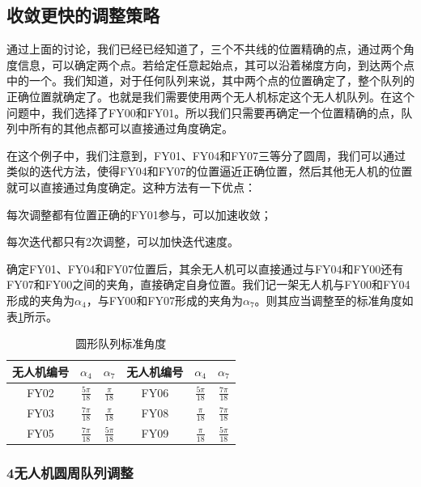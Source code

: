 \documentclass[12pt,AutoFakeSlant,AutoFakeBold]{article}
\begin{document}
\subsection{收敛更快的调整策略}

通过上面的讨论，我们已经已经知道了，三个不共线的位置精确的点，通过两个角度信息，可以确定两个点。若给定任意起始点，其可以沿着梯度方向，到达两个点中的一个。我们知道，对于任何队列来说，其中两个点的位置确定了，整个队列的正确位置就确定了。也就是我们需要使用两个无人机标定这个无人机队列。在这个问题中，我们选择了FY00和FY01。所以我们只需要再确定一个位置精确的点，队列中所有的其他点都可以直接通过角度确定。

在这个例子中，我们注意到，FY01、FY04和FY07三等分了圆周，我们可以通过类似的迭代方法，使得FY04和FY07的位置逼近正确位置，然后其他无人机的位置就可以直接通过角度确定。这种方法有一下优点：
\begin{itemize*}
    \item 每次调整都有位置正确的FY01参与，可以加速收敛；
    \item 每次迭代都只有2次调整，可以加快迭代速度。
\end{itemize*}

确定FY01、FY04和FY07位置后，其余无人机可以直接通过与FY04和FY00还有FY07和FY00之间的夹角，直接确定自身位置。我们记一架无人机与FY00和FY04形成的夹角为$\alpha_4$，与FY00和FY07形成的夹角为$\alpha_7$。则其应当调整至的标准角度如表\ref{tab:圆形队列标准角度}所示。

\begin{table}[!ht]
    \centering
    \caption{圆形队列标准角度}
    \label{tab:圆形队列标准角度}
    \begin{tabular}{ccc|ccc}
    \toprule
        无人机编号 & $\alpha_4$ & $\alpha_7$ & 无人机编号 & $\alpha_4$ & $\alpha_7$ \\ 
        \midrule
        FY02 & $\frac{5\pi}{18}$ & $\frac{\pi}{18}$ & FY06 & $\frac{5\pi}{18}$ & $\frac{7\pi}{18}$ \\ 
        FY03 & $\frac{7\pi}{18}$ & $\frac{\pi}{18}$ & FY08 & $\frac{\pi}{18}$ & $\frac{7\pi}{18}$\\ 
        FY05 & $\frac{7\pi}{18}$ & $\frac{5\pi}{18}$ & FY09 & $\frac{\pi}{18}$ & $\frac{5\pi}{18}$ \\ 
    \bottomrule
    \end{tabular}
\end{table}

\subsubsection{4无人机圆周队列调整}
\end{document}

